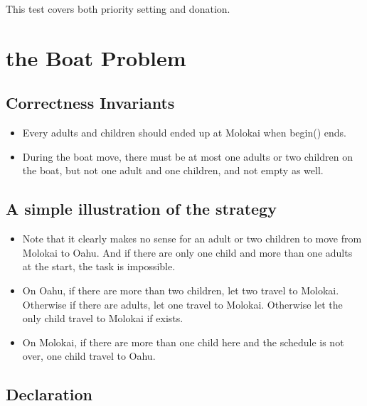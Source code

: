 \documentclass{article}
\begin{document}
	This test covers both priority setting and donation.
%	
	\section{the Boat Problem}
	
	\subsection{Correctness Invariants}
	
	\begin{itemize}
		\item Every adults and children should ended up at Molokai when begin() ends.
		
		\item During the boat move, there must be at most one adults or two children on the boat, but not one adult and one children, and not empty as well. 
	\end{itemize}
	
	\subsection{A simple illustration of the strategy}
	
	\begin{itemize}
		\item Note that it clearly makes no sense for an adult or two children to move from Molokai to Oahu. And if there are only one child and more than one adults at the start, the task is impossible.
		
		\item On Oahu, if there are more than two children, let two travel to Molokai. Otherwise if there are adults, let one travel to Molokai. Otherwise let the only child travel to Molokai if exists.
		
		\item On Molokai, if there are more than one child here and the schedule is not over, one child travel to Oahu.
	\end{itemize}
	
	\subsection{Declaration}
	
\end{document}

